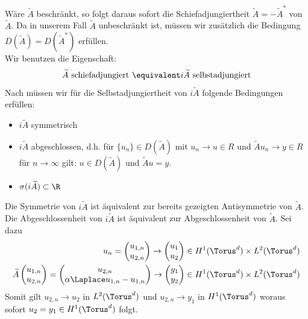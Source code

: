 Wäre $\widetilde{A}$ beschränkt, so folgt daraus sofort die Schiefadjungiertheit $\widetilde{A}=-\widetilde{A}^*$ von $\widetilde{A}$. Da in unserem Fall $\widetilde{A}$ unbeschränkt ist, müssen wir zusätzlich die Bedingung $D(\widetilde{A})=D(\widetilde{A}^*)$ erfüllen.\\
Wir benutzen die Eigenschaft:
\[\widetilde{A} \text{ schiefadjungiert } \equivalent i\widetilde{A} \text{ selbstadjungiert}\]
Nach \autocite[Bemerkung 5.6f]{HundSchnau} müssen wir für die Selbstadjungiertheit von $i\widetilde{A}$ folgende Bedingungen erfüllen:
\begin{itemize}
\item $i\widetilde{A}$ symmetrisch
\item $i\widetilde{A}$ abgeschlossen, d.h. für $\lbrace u_n \rbrace \in D(\widetilde{A})$ mit $u_n\to u\in R$ und $\widetilde{A}u_n\to y\in R$ für $n\to\infty$ gilt: $u\in D(\widetilde{A})$ und $\widetilde{A}u=y$.
\item $\sigma(i\widetilde{A})\subset \R$
\end{itemize}
Die Symmetrie von $i\widetilde{A}$ ist äquivalent zur bereits gezeigten Antisymmetrie von $\widetilde{A}$.\\
Die Abgeschlossenheit von $i\widetilde{A}$ ist äquivalent zur Abgeschlossenheit von $\widetilde{A}$. Sei dazu
\begin{align*}
u_n=\begin{pmatrix}u_{1,n}\\u_{2,n}\end{pmatrix}\to\begin{pmatrix}u_1\\u_2\end{pmatrix}\in H^1(\Torus^d)\times L^2(\Torus^d)\\
\widetilde{A}\begin{pmatrix}u_{1,n}\\u_{2,n}\end{pmatrix}=\begin{pmatrix}u_{2,n}\\\alpha\Laplace u_{1,n}-u_{1,n}\end{pmatrix}\to\begin{pmatrix}y_1\\y_2\end{pmatrix}\in H^1(\Torus^d)\times L^2(\Torus^d)
\end{align*} 
Somit gilt $u_{2,n}\to u_2$ in $L^2(\Torus^d)$ und $u_{2,n}\to y_1$ in $H^1(\Torus^d)$ woraus sofort $u_2=y_1\in H^1(\Torus^d)$ folgt.\\
